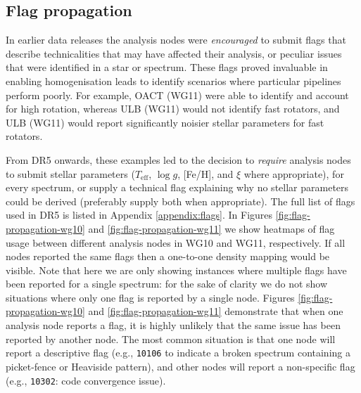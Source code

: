 \documentclass[preprint]{aastex}
\newcommand{\teff}{T_{\mathrm{eff}}}
\newcommand{\logg}{\log g}
\begin{document}










\subsection{Flag propagation}
\label{sec:flag-propagation}

In earlier data releases the analysis nodes were \emph{encouraged} to submit flags that
describe technicalities that may have affected their analysis, or peculiar issues
that were identified in a star or spectrum.  These flags proved invaluable in enabling 
homogenisation leads to identify scenarios where particular pipelines perform poorly. 
For example, OACT (WG11) were able to identify and account for high rotation, whereas 
ULB (WG11) would not identify fast rotators, and ULB (WG11) would report significantly
noisier stellar parameters for fast rotators.


From DR5 onwards, these examples led to the decision to \emph{require} analysis nodes 
to submit stellar parameters ($\teff$, $\logg$, [Fe/H], and $\xi$ where appropriate),
for every spectrum, or supply a technical flag explaining why no stellar parameters
could be derived (preferably supply both when appropriate). The full list of flags used
in DR5 is listed in Appendix \ref{appendix:flags}.  In Figures \ref{fig:flag-propagation-wg10}
and \ref{fig:flag-propagation-wg11} we show heatmaps of flag usage between different 
analysis nodes in WG10 and WG11, respectively.  If all nodes reported the same flags then
a one-to-one density mapping would be visible.  Note that here we are only showing instances
where multiple flags have been reported for a single spectrum: for the sake of clarity we
do not show situations where only one flag is reported by a single node.  Figures 
\ref{fig:flag-propagation-wg10} and \ref{fig:flag-propagation-wg11} demonstrate that when one analysis node reports a flag, it
is highly unlikely that the same issue has been reported by another node. The most common
situation is that one node will report a descriptive flag (e.g., \texttt{10106} 
to indicate a broken spectrum containing a picket-fence or Heaviside pattern), and other
nodes will report a non-specific flag (e.g., \texttt{10302}: code convergence issue).
\end{document}
